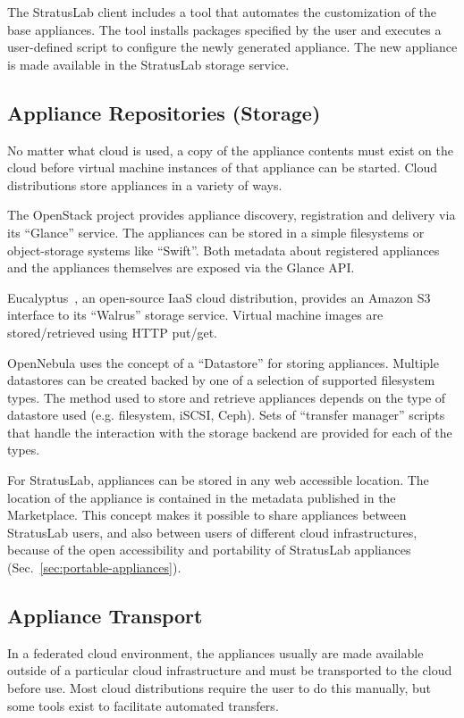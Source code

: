 The StratusLab client includes a tool that automates the customization
of the base appliances.  The tool installs packages specified by the
user and executes a user-defined script to configure the newly
generated appliance. The new appliance is made available in the
StratusLab storage service.

\subsection{Appliance Repositories (Storage)}

No matter what cloud is used, a copy of the appliance contents must
exist on the cloud before virtual machine instances of that appliance
can be started.  Cloud distributions store appliances in a variety of
ways.

The OpenStack project provides appliance discovery, registration and
delivery via its ``Glance'' service. The appliances can be stored in a
simple filesystems or object-storage systems like ``Swift''\@. Both
metadata about registered appliances and the appliances themselves are
exposed via the Glance API\@.

Eucalyptus~\cite{eucalyptus}, an open-source IaaS cloud distribution,
provides an Amazon S3 interface to its ``Walrus'' storage
service. Virtual machine images are stored/retrieved using HTTP
put/get.

OpenNebula uses the concept of a ``Datastore'' for storing appliances.
Multiple datastores can be created backed by one of a selection of
supported filesystem types.  The method used to store and retrieve
appliances depends on the type of datastore used (e.g. filesystem,
iSCSI, Ceph). Sets of ``transfer manager'' scripts that handle the
interaction with the storage backend are provided for each of the
types.

For StratusLab, appliances can be stored in any web accessible
location. The location of the appliance is contained in the metadata
published in the Marketplace\@. This concept makes it possible to
share appliances between StratusLab users, and also between users of
different cloud infrastructures, because of the open accessibility and
portability of StratusLab appliances
(Sec.~\ref{sec:portable-appliances}).

\subsection{Appliance Transport}

In a federated cloud environment, the appliances usually are made
available outside of a particular cloud infrastructure and must be
transported to the cloud before use.  Most cloud distributions require
the user to do this manually, but some tools exist to facilitate
automated transfers.

